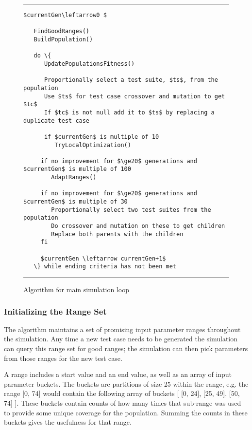 \documentclass[runningheads]{llncs}
\begin{document}
\begin{figure}[h!]
	\begin{center}
		\hrule
		\medskip
\begin{Verbatim}[fontfamily=tt, xleftmargin=10pt, commandchars=\\\{\},
codes={\catcode`$=3\catcode`^=7\catcode`_=8}]
   $currentGen\leftarrow0 $
   
   FindGoodRanges()
   BuildPopulation()
   
   do \{
      UpdatePopulationsFitness()
   
      Proportionally select a test suite, $ts$, from the population
      Use $ts$ for test case crossover and mutation to get $tc$
      If $tc$ is not null add it to $ts$ by replacing a duplicate test case
   
      if $currentGen$ is multiple of 10
         TryLocalOptimization()
   
     if no improvement for $\ge20$ generations and $currentGen$ is multiple of 100
        AdaptRanges()
   
     if no improvement for $\ge20$ generations and $currentGen$ is multiple of 30 
        Proportionally select two test suites from the population
        Do crossover and mutation on these to get children
        Replace both parents with the children
     fi
   
     $currentGen \leftarrow currentGen+1$
   \} while ending criteria has not been met
\end{Verbatim}
\hrule
	\end{center}
	\caption{Algorithm for main simulation loop \label{fig:simLoopAlt}}
\end{figure}
\FloatBarrier

\subsubsection{Initializing the Range Set}

The algorithm maintains a set of promising input parameter ranges throughout the simulation. Any time a new test case needs to be generated the simulation can query this range set for good ranges; the simulation can then pick parameters from those ranges for the new test case. 

A range includes a start value and an end value, as well as an array of input parameter buckets. The buckets are partitions of size 25 within the range, e.g. the range [0, 74] would contain the following array of buckets [ [0, 24], [25, 49], [50, 74] ]. These buckets contain counts of how many times that sub-range was used to provide some unique coverage for the population. Summing the counts in these buckets gives the usefulness for that range.
\end{document}
